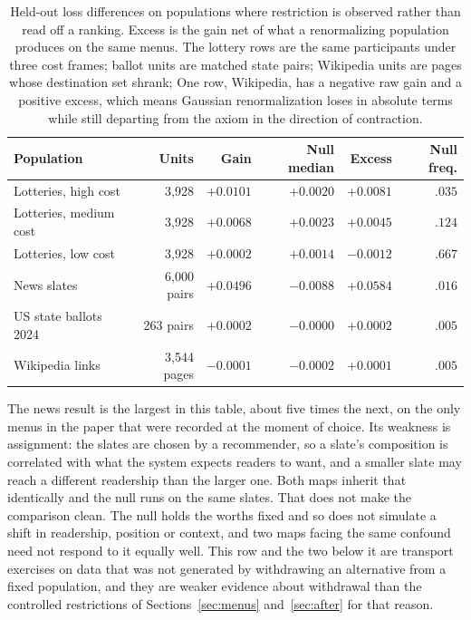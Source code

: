\documentclass[11pt]{article}
\begin{document}
\begin{table}[ht]
\centering
\small
\begin{tabular}{lrrrrr}
\toprule
Population & Units & Gain & Null median & Excess & Null freq. \\
\midrule
Lotteries, high cost & 3{,}928 & $+0.0101$ & $+0.0020$ & $+0.0081$ & $.035$ \\
Lotteries, medium cost & 3{,}928 & $+0.0068$ & $+0.0023$ & $+0.0045$ & $.124$ \\
Lotteries, low cost & 3{,}928 & $+0.0002$ & $+0.0014$ & $-0.0012$ & $.667$ \\
News slates & 6{,}000 pairs & $+0.0496$ & $-0.0088$ & $+0.0584$ & $.016$ \\
US state ballots 2024 & 263 pairs & $+0.0002$ & $-0.0000$ & $+0.0002$ & $.005$ \\
Wikipedia links & 3{,}544 pages & $-0.0001$ & $-0.0002$ & $+0.0001$ & $.005$ \\
\bottomrule
\end{tabular}
\caption{Held-out loss differences on populations where restriction is observed rather
than read off a ranking. Excess is the gain net of what a renormalizing population
produces on the same menus. The lottery rows are the same participants under three cost
frames; ballot units are matched state pairs; Wikipedia units are pages whose destination set shrank; One row, Wikipedia, has a
negative raw gain and a positive excess, which means Gaussian renormalization loses in absolute
terms while still departing from the axiom in the direction of contraction.}
\label{tab:more}
\end{table}

The news result is the largest in this table, about five times the next, on the only menus in the paper
that were recorded at the moment of choice. Its weakness is assignment: the slates are chosen
by a recommender, so a slate's composition is correlated with what the system expects readers
to want, and a smaller slate may reach a different readership than the larger one. Both maps
inherit that identically and the null runs on the same slates. That does not make the
comparison clean. The null holds the worths fixed and so does not simulate a shift in
readership, position or context, and two maps facing the same confound need not respond to it
equally well. This row and the two below it are transport exercises on data that was not
generated by withdrawing an alternative from a fixed population, and they are weaker evidence
about withdrawal than the controlled restrictions of Sections~\ref{sec:menus}
and~\ref{sec:after} for that reason.
\end{document}
